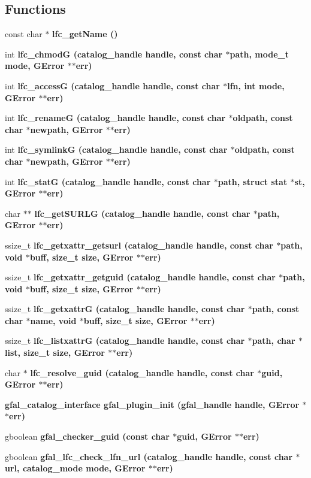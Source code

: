 \subsection*{Functions}
\begin{CompactItemize}
\item 
const char $\ast$ \bf{lfc\_\-get\-Name} ()
\item 
int \bf{lfc\_\-chmod\-G} (catalog\_\-handle handle, const char $\ast$path, mode\_\-t mode, GError $\ast$$\ast$err)
\item 
int \bf{lfc\_\-access\-G} (catalog\_\-handle handle, const char $\ast$lfn, int mode, GError $\ast$$\ast$err)
\item 
int \bf{lfc\_\-rename\-G} (catalog\_\-handle handle, const char $\ast$oldpath, const char $\ast$newpath, GError $\ast$$\ast$err)
\item 
int \bf{lfc\_\-symlink\-G} (catalog\_\-handle handle, const char $\ast$oldpath, const char $\ast$newpath, GError $\ast$$\ast$err)
\item 
int \bf{lfc\_\-stat\-G} (catalog\_\-handle handle, const char $\ast$path, struct stat $\ast$st, GError $\ast$$\ast$err)
\item 
char $\ast$$\ast$ \bf{lfc\_\-get\-SURLG} (catalog\_\-handle handle, const char $\ast$path, GError $\ast$$\ast$err)
\item 
ssize\_\-t \bf{lfc\_\-getxattr\_\-getsurl} (catalog\_\-handle handle, const char $\ast$path, void $\ast$buff, size\_\-t size, GError $\ast$$\ast$err)
\item 
ssize\_\-t \bf{lfc\_\-getxattr\_\-getguid} (catalog\_\-handle handle, const char $\ast$path, void $\ast$buff, size\_\-t size, GError $\ast$$\ast$err)
\item 
ssize\_\-t \bf{lfc\_\-getxattr\-G} (catalog\_\-handle handle, const char $\ast$path, const char $\ast$name, void $\ast$buff, size\_\-t size, GError $\ast$$\ast$err)
\item 
ssize\_\-t \bf{lfc\_\-listxattr\-G} (catalog\_\-handle handle, const char $\ast$path, char $\ast$list, size\_\-t size, GError $\ast$$\ast$err)
\item 
char $\ast$ \bf{lfc\_\-resolve\_\-guid} (catalog\_\-handle handle, const char $\ast$guid, GError $\ast$$\ast$err)
\item 
\bf{gfal\_\-catalog\_\-interface} \bf{gfal\_\-plugin\_\-init} (gfal\_\-handle handle, GError $\ast$$\ast$err)
\item 
gboolean \bf{gfal\_\-checker\_\-guid} (const char $\ast$guid, GError $\ast$$\ast$err)
\item 
gboolean \bf{gfal\_\-lfc\_\-check\_\-lfn\_\-url} (catalog\_\-handle handle, const char $\ast$url, catalog\_\-mode mode, GError $\ast$$\ast$err)
\end{CompactItemize}
